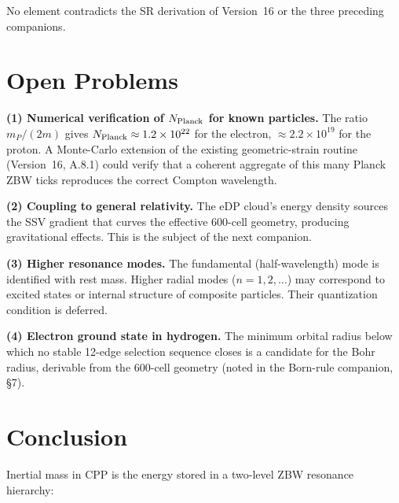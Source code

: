 \documentclass[12pt]{article}
\newcommand{\mP}{m_P}
\begin{document}
No element contradicts the SR derivation of Version~16 or the three
preceding companions.

\section{Open Problems}
\label{sec:open}

\textbf{(1) Numerical verification of $N_{\rm Planck}$ for known particles.}
The ratio $\mP/(2m)$ gives $N_{\rm Planck}\approx1.2\times10^{22}$ for
the electron, $\approx2.2\times10^{19}$ for the proton.  A Monte-Carlo
extension of the existing geometric-strain routine (Version~16, A.8.1)
could verify that a coherent aggregate of this many Planck ZBW ticks
reproduces the correct Compton wavelength.

\textbf{(2) Coupling to general relativity.}  The eDP cloud's energy
density sources the SSV gradient that curves the effective 600-cell
geometry, producing gravitational effects.  This is the subject of the next
companion.

\textbf{(3) Higher resonance modes.}  The fundamental (half-wavelength)
mode is identified with rest mass.  Higher radial modes ($n =
1,2,\ldots$) may correspond to excited states or internal structure of
composite particles.  Their quantization condition is deferred.

\textbf{(4) Electron ground state in hydrogen.}  The minimum orbital radius
below which no stable 12-edge selection sequence closes is a candidate for
the Bohr radius, derivable from the 600-cell geometry (noted in the
Born-rule companion, \S7).

\section{Conclusion}
\label{sec:conclusion}

Inertial mass in CPP is the energy stored in a two-level ZBW resonance
hierarchy:
\end{document}
